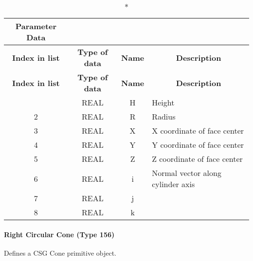 \begin{longtable}[H]{|c|c|c|l|}
  \caption*{Parameter Data} \\

  \hline
  \multicolumn{1}{|c|}{\textbf{Index in list}} & \multicolumn{1}{|c|}{\textbf{Type of data}} &
  \multicolumn{1}{|c|}{\textbf{Name}} & \multicolumn{1}{|c|}{\textbf{Description}} \\ \hline
  \endfirsthead
  \hline
  
  \multicolumn{1}{|c|}{\textbf{Index in list}} & \multicolumn{1}{|c|}{\textbf{Type of data}} &
  \multicolumn{1}{|c|}{\textbf{Name}} & \multicolumn{1}{|c|}{\textbf{Description}} \\ \hline
  \endhead
  
  \endfoot

  \endlastfootd
1 & REAL & H & Height\\ \hline
2 & REAL & R & Radius\\ \hline
3 & REAL & X & X coordinate of face center\\ \hline
4 & REAL & Y & Y coordinate of face center\\ \hline
5 & REAL & Z & Z coordinate of face center\\ \hline
6 & REAL & i & Normal vector along cylinder axis\\ \hline
7 & REAL & j &\\ \hline
8 & REAL & k &\\ \hline
\end{longtable}

\paragraph{Right Circular Cone (Type
156)}\label{right-circular-cone-type-156}

Defines a CSG Cone primitive object.


